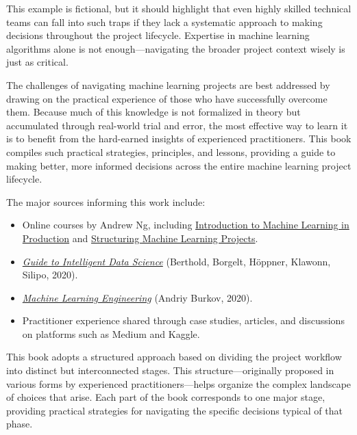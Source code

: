 \documentclass[12pt,openany]{book}
\begin{document}
This example is fictional, but it should highlight that even highly skilled technical teams can fall into such traps if they lack a systematic approach to making decisions throughout the project lifecycle. Expertise in machine learning algorithms alone is not enough—navigating the broader project context wisely is just as critical. \newline

The challenges of navigating machine learning projects are best addressed by drawing on the practical experience of those who have successfully overcome them. Because much of this knowledge is not formalized in theory but accumulated through real-world trial and error, the most effective way to learn it is to benefit from the hard-earned insights of experienced practitioners. This book compiles such practical strategies, principles, and lessons, providing a guide to making better, more informed decisions across the entire machine learning project lifecycle. \newline

The major sources informing this work include:

\begin{itemize} 
\item Online courses by Andrew Ng, including \href{https://www.coursera.org/learn/introduction-to-machine-learning-in-production}{Introduction to Machine Learning in Production} and \href{https://www.coursera.org/learn/machine-learning-projects}{Structuring Machine Learning Projects}. 
\item \href{https://link.springer.com/book/10.1007/978-3-030-45574-3}{\textit{Guide to Intelligent Data Science}} (Berthold, Borgelt, Höppner, Klawonn, Silipo, 2020).
\item \href{https://www.amazon.it/Machine-Learning-Engineering-Andriy-Burkov/dp/1999579577}{\textit{Machine Learning Engineering}} (Andriy Burkov, 2020).
\item Practitioner experience shared through case studies, articles, and discussions on platforms such as Medium and Kaggle. \end{itemize}

This book adopts a structured approach based on dividing the project workflow into distinct but interconnected stages. This structure—originally proposed in various forms by experienced practitioners—helps organize the complex landscape of choices that arise. Each part of the book corresponds to one major stage, providing practical strategies for navigating the specific decisions typical of that phase. \newline
\end{document}
